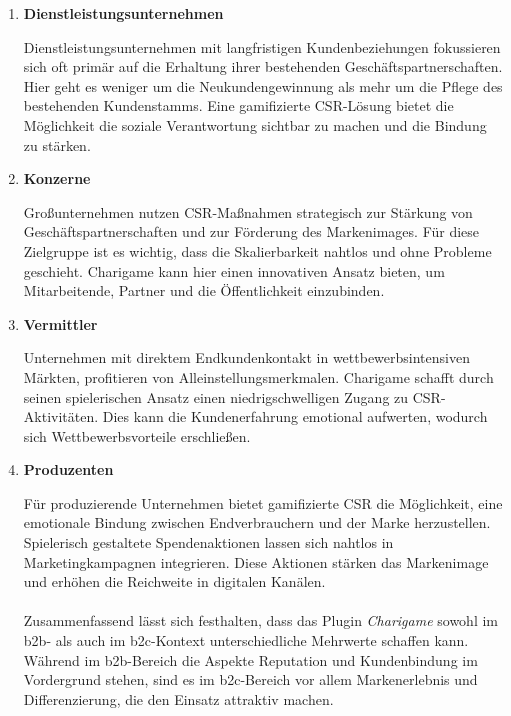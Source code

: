 \begin{enumerate}
    \item \textbf{Dienstleistungsunternehmen}

Dienstleistungsunternehmen mit langfristigen Kundenbeziehungen fokussieren sich oft primär auf die Erhaltung ihrer bestehenden Geschäftspartnerschaften.
Hier geht es weniger um die Neukundengewinnung als mehr um die Pflege des bestehenden Kundenstamms.
Eine gamifizierte CSR-Lösung bietet die Möglichkeit die soziale Verantwortung sichtbar zu machen und die Bindung zu stärken.

    \item \textbf{Konzerne}

Großunternehmen nutzen CSR-Maßnahmen strategisch zur Stärkung von Geschäftspartnerschaften und zur Förderung des Markenimages.
Für diese Zielgruppe ist es wichtig, dass die Skalierbarkeit nahtlos und ohne Probleme geschieht.
Charigame kann hier einen innovativen Ansatz bieten, um Mitarbeitende, Partner und die Öffentlichkeit einzubinden.

    \item \textbf{Vermittler}

Unternehmen mit direktem Endkundenkontakt in wettbewerbsintensiven Märkten, profitieren von Alleinstellungsmerkmalen.
Charigame schafft durch seinen spielerischen Ansatz einen niedrigschwelligen Zugang zu CSR-Aktivitäten.
Dies kann die Kundenerfahrung emotional aufwerten, wodurch sich Wettbewerbsvorteile erschließen.

    \item \textbf{Produzenten}

Für produzierende Unternehmen bietet gamifizierte CSR die Möglichkeit, eine emotionale Bindung zwischen Endverbrauchern und der Marke herzustellen.
Spielerisch gestaltete Spendenaktionen lassen sich nahtlos in Marketingkampagnen integrieren.
Diese Aktionen stärken das Markenimage und erhöhen die Reichweite in digitalen Kanälen.\\\\
Zusammenfassend lässt sich festhalten, dass das Plugin \textit{Charigame} sowohl im \gls{b2b}- als auch im \gls{b2c}-Kontext unterschiedliche Mehrwerte schaffen kann.
Während im \gls{b2b}-Bereich die Aspekte Reputation und Kundenbindung im Vordergrund stehen, sind es im \gls{b2c}-Bereich vor allem Markenerlebnis und Differenzierung, die den Einsatz attraktiv machen.
\end{enumerate}

